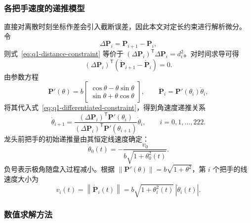\documentclass[UTF8,fontset=windows,a4paper,12pt]{ctexart}
\begin{document}
\subsubsection{各把手速度的递推模型}

直接对离散时刻坐标作差会引入截断误差，因此本文对定长约束进行解析微分。
令
\begin{equation}
  \Delta\bm P_i=\bm P_{i+1}-\bm P_i,
\end{equation}
则式~\eqref{eq:q1-distance-constraint} 等价于
$\left(\Delta\bm P_i\right)^\mathsf{T}\Delta\bm P_i=d_i^2$。对时间求导可得
\begin{equation}
  \left(\Delta\bm P_i\right)^\mathsf{T}
  \left(\dot{\bm P}_{i+1}-\dot{\bm P}_i\right)=0.
  \label{eq:q1-differentiated-constraint}
\end{equation}
由参数方程
\begin{equation}
  \bm P'(\theta)
  =b
  \begin{bmatrix}
    \cos\theta-\theta\sin\theta\\
    \sin\theta+\theta\cos\theta
  \end{bmatrix},
  \qquad
  \dot{\bm P}_i=\bm P'(\theta_i)\dot\theta_i,
  \label{eq:q1-derivative}
\end{equation}
将其代入式~\eqref{eq:q1-differentiated-constraint}，得到角速度递推关系
\begin{equation}
  \dot\theta_{i+1}
  =\frac{
    \left(\Delta\bm P_i\right)^\mathsf{T}\bm P'(\theta_i)
  }{
    \left(\Delta\bm P_i\right)^\mathsf{T}\bm P'(\theta_{i+1})
  }\dot\theta_i,
  \qquad i=0,1,\ldots,222.
  \label{eq:q1-angular-velocity}
\end{equation}
龙头前把手的初始递推量由其恒定线速度确定：
\begin{equation}
  \dot\theta_0(t)
  =-\frac{v_0}{b\sqrt{1+\theta_0^2(t)}}.
  \label{eq:q1-head-angular-velocity}
\end{equation}
负号表示极角随盘入过程减小。根据
$\|\bm P'(\theta)\|=b\sqrt{1+\theta^2}$，第 $i$ 个把手的线速度大小为
\begin{equation}
  v_i(t)
  =\left\|\dot{\bm P}_i(t)\right\|
  =b\sqrt{1+\theta_i^2(t)}\,
   \left|\dot\theta_i(t)\right|.
  \label{eq:q1-linear-velocity}
\end{equation}

\subsubsection{数值求解方法}
\end{document}
